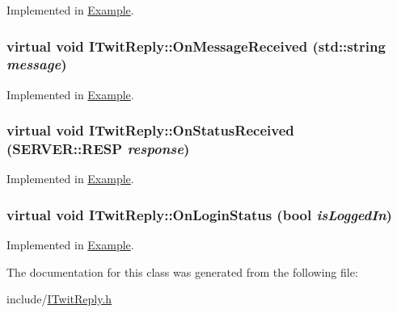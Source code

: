 Implemented in \hyperlink{classExample_5036bf79a0efef457605da87dafc5bce}{Example}.\hypertarget{classITwitReply_a103f872024b0a36e669b0d82a26a528}{
\subsubsection{\setlength{\rightskip}{0pt plus 5cm}virtual void ITwitReply::OnMessageReceived (std::string {\em message})}}
\label{classITwitReply_a103f872024b0a36e669b0d82a26a528}




Implemented in \hyperlink{classExample_dfbedb6e9eeca0195736f6d3f89d25d8}{Example}.\hypertarget{classITwitReply_9011b418bb62f734a2e3cd447815ec90}{
\subsubsection{\setlength{\rightskip}{0pt plus 5cm}virtual void ITwitReply::OnStatusReceived ({\bf SERVER::RESP} {\em response})}}
\label{classITwitReply_9011b418bb62f734a2e3cd447815ec90}




Implemented in \hyperlink{classExample_f099176fe389428fa17ccd89f6514833}{Example}.\hypertarget{classITwitReply_691e9bcbe06bd66233b1c870d2e4d67d}{
\subsubsection{\setlength{\rightskip}{0pt plus 5cm}virtual void ITwitReply::OnLoginStatus (bool {\em isLoggedIn})}}
\label{classITwitReply_691e9bcbe06bd66233b1c870d2e4d67d}




Implemented in \hyperlink{classExample_491e8add0ddfeca10f367f5904e232be}{Example}.

The documentation for this class was generated from the following file:\begin{CompactItemize}
\item 
include/\hyperlink{ITwitReply_8h}{ITwitReply.h}\end{CompactItemize}
